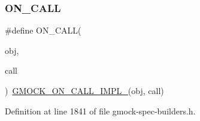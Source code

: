 \mbox{\label{gmock-spec-builders_8h_a5b12ae6cf84f0a544ca811b380c37334}} 
\subsubsection{\texorpdfstring{O\+N\+\_\+\+C\+A\+LL}{ON\_CALL}}
{\footnotesize\ttfamily \#define O\+N\+\_\+\+C\+A\+LL(\begin{DoxyParamCaption}\item[{}]{obj,  }\item[{}]{call }\end{DoxyParamCaption})~\hyperlink{gmock-spec-builders_8h_a7c47d936dcf489ac84c046740aea777e}{G\+M\+O\+C\+K\+\_\+\+O\+N\+\_\+\+C\+A\+L\+L\+\_\+\+I\+M\+P\+L\+\_\+}(obj, call)}



Definition at line 1841 of file gmock-\/spec-\/builders.\+h.

